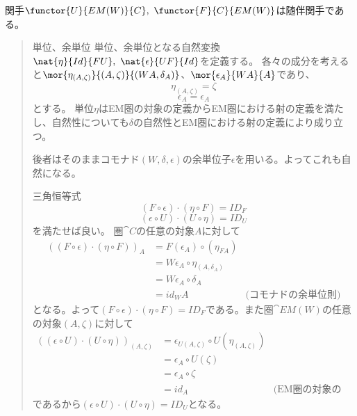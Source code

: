 \documentclass[uplatex,dvipdfmx]{jsarticle}
\begin{document}
  \begin{prop}[余自由忘却随伴]
    関手$\functor{U}{EM(W)}{C},\ \functor{F}{C}{EM(W)}$は随伴関手である。
    \begin{quote}
      \begin{mydescription}
        \item[単位、余単位]
        単位、余単位となる自然変換$\nat{\eta}{Id}{FU},\ \nat{\epsilon}{UF}{Id}$を定義する。
        各々の成分を考えると$\mor{\eta_{(A,\zeta)}}{(A,\zeta)}{(WA,\delta_A)}$、$\mor{\epsilon_A}{WA}{A}$であり、
        \[\eta_{(A,\zeta)} = \zeta\]
        \[\epsilon_A = \epsilon_A\]とする。
        単位$\eta$はEM圏の対象の定義からEM圏における射の定義を満たし、自然性についても$\delta$の自然性とEM圏における射の定義により成り立つ。

        後者はそのままコモナド$(W,\delta,\epsilon)$の余単位子$\epsilon$を用いる。よってこれも自然になる。
        \item[三角恒等式]
        \[(F\circ\epsilon)\cdot(\eta\circ F) = ID_F\]
        \[(\epsilon\circ U)\cdot(U\circ\eta) = ID_U\]を満たせば良い。
        圏$\cat{C}$の任意の対象$A$に対して
        \begin{align*}
          ((F\circ\epsilon)\cdot(\eta\circ F))_A&=F(\epsilon_A)\circ(\eta_{FA})\\
          &=W\epsilon_A\circ\eta_{(A,\delta_A)}\\
          &=W\epsilon_A\circ\delta_A\\
          &=id_WA&\text{(コモナドの余単位則)}
        \end{align*}
        となる。よって$(F\circ\epsilon)\cdot(\eta\circ F) = ID_F$である。また圏$\cat{EM}(W)$の任意の対象$(A,\zeta)$に対して
        \begin{align*}
          ((\epsilon\circ U)\cdot(U\circ\eta))_{(A,\zeta)}
          &=\epsilon_{U(A,\zeta)}\circ U(\eta_{(A,\zeta)})\\
          &=\epsilon_A\circ U(\zeta)\\
          &=\epsilon_A\circ \zeta\\
          &=id_A&\text{(EM圏の対象の定義)}
        \end{align*}
        であるから$(\epsilon\circ U)\cdot(U\circ\eta) = ID_U$となる。
      \end{mydescription}
    \end{quote}
  \end{prop}
\end{document}
